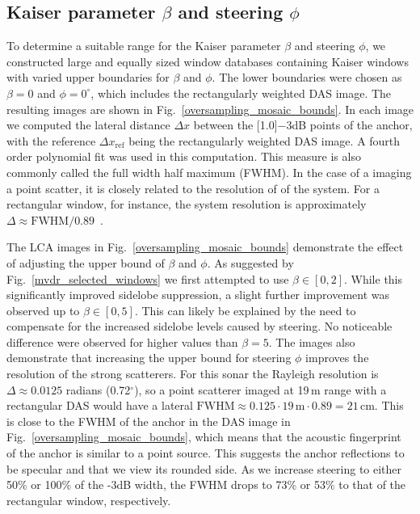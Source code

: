 \documentclass[10pt,journal,draftclsnofoot,onecolumn]{IEEEtran}
\newcommand\Fig[1]{Fig.~\ref{#1}}
\newcommand\1{\vec 1}
\newcommand\minus{\scalebox{0.75}[1.0]{$-$}}
\begin{document}
\subsection{Kaiser parameter $\beta$ and steering $\phi$}\label{sec:results_window_parameters}

To determine a suitable range for the Kaiser parameter $\beta$ and steering $\phi$, we constructed large and equally sized window databases containing Kaiser windows with varied upper boundaries for $\beta$ and $\phi$. The lower boundaries were chosen as $\beta=0$ and $\phi=0^\circ$, which includes the rectangularly weighted DAS image. The resulting images are shown in \Fig{oversampling_mosaic_bounds}. In each image we computed the lateral distance $\Delta x$ between the \minus{}3dB points of the anchor, with the reference $\Delta x_\text{ref}$ being the rectangularly weighted DAS image. A fourth order polynomial fit was used in this computation. This measure is also commonly called the full width half maximum (FWHM). In the case of a imaging a point scatter, it is closely related to the resolution of of the system. For a rectangular window, for instance, the system resolution is approximately $\Delta \approx \text{FWHM}/0.89$~\cite{Harris1978}.

The LCA images in \Fig{oversampling_mosaic_bounds} demonstrate the effect of adjusting the upper bound of $\beta$ and $\phi$. As suggested by \Fig{mvdr_selected_windows} we first attempted to use $\beta\in[0,2]$. While this significantly improved sidelobe suppression, a slight further improvement was observed up to $\beta\in[0,5]$. This can likely be explained by the need to compensate for the increased sidelobe levels caused by steering. No noticeable difference were observed for higher values than $\beta=5$. The images also demonstrate that increasing the upper bound for steering $\phi$ improves the resolution of the strong scatterers. For this sonar the Rayleigh resolution is $\Delta\approx0.0125$ radians (0.72$^\circ$), so a point scatterer imaged at 19\,m range with a rectangular DAS would have a lateral $\text{FWHM}\approx0.125\cdot19\,\text{m}\cdot0.89=21\,\text{cm}$. This is close to the FWHM of the anchor in the DAS image in \Fig{oversampling_mosaic_bounds}, which means that the acoustic fingerprint of the anchor is similar to a point source. This suggests the anchor reflections to be specular and that we view its rounded side. As we increase steering to either 50\% or 100\% of the -3dB width, the FWHM drops to 73\% or 53\% to that of the rectangular window, respectively.
\end{document}
